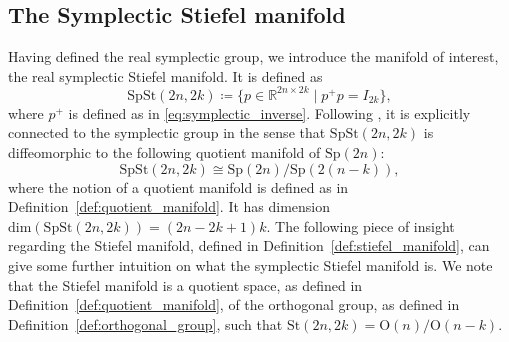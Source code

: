 \subsection{The Symplectic Stiefel manifold}
Having defined the real symplectic group, we introduce the manifold of interest, the real symplectic Stiefel manifold. It is defined as
\begin{equation}\label{eq:spst_def}
    \mathrm{SpSt}(2n, 2k)\coloneqq \{p\in \mathbb{R}^{2n\times2k} \;|\; p^{+}p=I_{2k}\},
\end{equation}
where $p^{+}$ is defined as in \eqref{eq:symplectic_inverse}. Following \cite[Prop.~3.1]{BendokatZimmermann2021}, it is explicitly connected to the symplectic group in the sense that $\mathrm{SpSt}(2n, 2k)$ is diffeomorphic to the following quotient manifold of $\mathrm{Sp}(2n)$:
\begin{equation*}
    \mathrm{SpSt}(2n, 2k)\cong \mathrm{Sp}(2n)/\mathrm{Sp}(2(n-k)),
\end{equation*}
where the notion of a quotient manifold is defined as in Definition~\ref{def:quotient_manifold}. It has dimension \\$\mathrm{dim}(\mathrm{SpSt}(2n, 2k))=(2n-2k+1)k$. The following piece of insight regarding the Stiefel manifold, defined in Definition~\ref{def:stiefel_manifold}, can give some further intuition on what the symplectic Stiefel manifold is. We note that the Stiefel manifold is a quotient space, as defined in Definition~\ref{def:quotient_manifold}, of the orthogonal group, as defined in Definition~\ref{def:orthogonal_group}, such that $\mathrm{St}(2n, 2k)=\mathrm{O}(n)/\mathrm{O}(n-k)$. 

